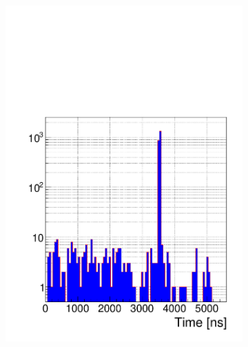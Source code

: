     \begin{figure}[H]
		\begin{subfigure}{.5\linewidth}
		    \centering
			\includegraphics[width = .9\linewidth]{fig/chapt6/Muon-Time-Profile-gRPC-CMS-FEB.pdf}
			\caption{\label{fig:time-profiles:A}}
		\end{subfigure}
		\begin{subfigure}{.5\linewidth}
		    \centering

\end{subfigure}
\end{figure}
